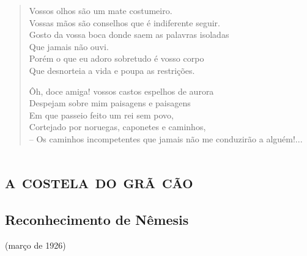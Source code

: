 \begin{verse}
Vossos olhos são um mate costumeiro.\\
Vossas mãos são conselhos que é indiferente seguir.\\
Gosto da vossa boca donde saem as palavras isoladas\\
Que jamais não ouvi.\\
Porém o que eu adoro sobretudo é vosso corpo\\
Que desnorteia a vida e poupa as restrições.

Ôh, doce amiga! vossos castos espelhos de aurora\\
Despejam sobre mim paisagens e paisagens\\
Em que passeio feito um rei sem povo,\\
Cortejado por noruegas, caponetes e caminhos,\\
-- Os caminhos incompetentes que jamais não me conduzirão a alguém!...\\
\end{verse}


\part{\textsc{a costela do grã cão}}
\removeepigraph

\chapter{Reconhecimento de Nêmesis}{(março de 1926)}{}


